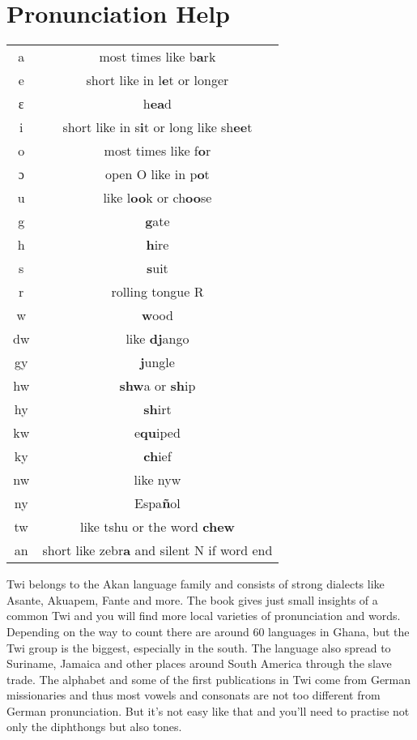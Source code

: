\documentclass[%
 fontsize=11pt,%
 a5paper,pagesize,
 paper=a5,%
 DIV=9,%
 parskip=half*,%
 twoside=true,
 pointlessnumbers
]{scrbook}%
\begin{document}
\chapter{Pronunciation Help}
\small{
\begin{center}
    \begin{tabular}{cc}
       a & most times like b\textbf{a}rk \\
       e & short like in l\textbf{e}t or longer \\
       ɛ & h\textbf{ea}d \\
       i & short like in s\textbf{i}t or long like sh\textbf{ee}t \\
       o & most times like f\textbf{o}r\\
       ɔ & open O like in p\textbf{o}t \\
       u & like l\textbf{oo}k or ch\textbf{oo}se \\
       g & \textbf{g}ate \\
       h & \textbf{h}ire \\
       s & \textbf{s}uit \\
       r & rolling tongue R \\
       w & \textbf{w}ood \\
       dw & like \textbf{dj}ango \\
       gy & \textbf{j}ungle \\
       hw & \textbf{shw}a or \textbf{sh}ip \\
       hy & \textbf{sh}irt \\
       kw & e\textbf{qu}iped \\
       ky & \textbf{ch}ief \\
       nw & like nyw \\
       ny & Espa\textbf{ñ}ol \\
       tw & like tshu or the word \textbf{chew} \\
       an & short like zebr\textbf{a} and silent N if word end \\
    \end{tabular}
\end{center}
}

Twi belongs to the Akan language family and consists of strong dialects like Asante, Akuapem, Fante and more. The book gives just small insights of a common Twi and you will find more local varieties of pronunciation and words. Depending on the way to count there are around 60 languages in Ghana, but the Twi group is the biggest, especially in the south. The language also spread to Suriname, Jamaica and other places around South America through the slave trade. The alphabet and some of the first publications in Twi come from German missionaries and thus most vowels and consonats are not too different from German pronunciation. But it's not easy like that and you'll need to practise not only the diphthongs but also tones.
\end{document}
